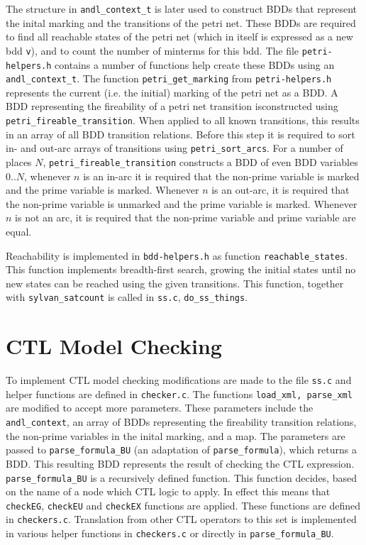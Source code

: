 \documentclass[twoside, a4paper]{article}
\begin{document}
The structure in \texttt{andl\_context\_t} is later used to construct BDDs that represent the inital marking and the transitions of the petri net. These BDDs are required to find all reachable states of the petri net (which in itself is expressed as a new bdd \texttt{v}), and to count the number of minterms for this bdd. The file \texttt{petri-helpers.h} contains a number of functions help create these BDDs using an \texttt{andl\_context\_t}. The function \texttt{petri\_get\_marking} from \texttt{petri-helpers.h} represents the current (i.e. the initial) marking of the petri net as a BDD. A BDD representing the fireability of a petri net transition isconstructed using \texttt{petri\_fireable\_transition}. When applied to all known transitions, this results in an array of all BDD transition relations. Before this step it is required to sort in- and out-arc arrays of transitions using \texttt{petri\_sort\_arcs}. For a number of places $N$, \texttt{petri\_fireable\_transition} constructs a BDD of even BDD variables $0..N$, whenever $n$ is an in-arc it is required that the non-prime variable is marked and the prime variable is marked. Whenever $n$ is an out-arc, it is required that the non-prime variable is unmarked and the prime variable is marked. Whenever $n$ is not an arc, it is required that the non-prime variable and prime variable are equal.

Reachability is implemented in \texttt{bdd-helpers.h} as function \texttt{reachable\_states}. This function implements breadth-first search, growing the initial states until no new states can be reached using the given transitions. This function, together with \texttt{sylvan\_satcount} is called in \texttt{ss.c}, \texttt{do\_ss\_things}.

\section{CTL Model Checking}
To implement CTL model checking modifications are made to the file \texttt{ss.c} and helper functions are defined in \texttt{checker.c}. The functions \texttt{load\_xml, parse\_xml} are modified to accept more parameters. These parameters include the \texttt{andl\_context}, an array of BDDs representing the fireability transition relations, the non-prime variables in the inital marking, and a map. The parameters are passed to \texttt{parse\_formula\_BU} (an adaptation of \texttt{parse\_formula}), which returns a BDD. This resulting BDD represents the result of checking the CTL expression. \texttt{parse\_formula\_BU} is a recursively defined function. This function decides, based on the name of a node which CTL logic to apply. In effect this means that \texttt{checkEG}, \texttt{checkEU} and \texttt{checkEX} functions are applied. These functions are defined in \texttt{checkers.c}. Translation from other CTL operators to this set is implemented in various helper functions in \texttt{checkers.c} or directly in \texttt{parse\_formula\_BU}.
\end{document}
